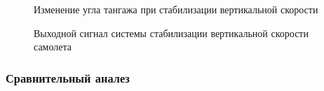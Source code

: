 \begin{figure}[H]
    \caption{Изменение угла тангажа при стабилизации вертикальной скорости}
    \label{fig:Входной сигнал системы изменения тангажа}
\end{figure}

\begin{figure}[H]
    \caption{Выходной сигнал системы стабилизации вертикальной скорости самолета}
    \label{fig:Входной сигнал системы стабилизации вертикальной скорости}
\end{figure}



\begin{center}
    \subsubsection{Сравнительный аналез}
\end{center}

